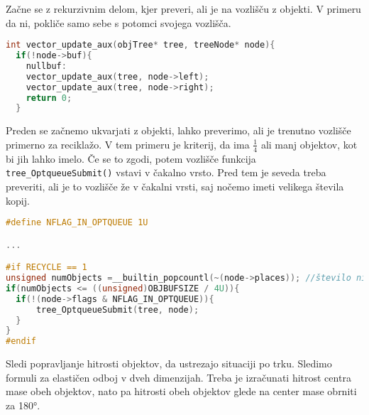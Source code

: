 \documentclass[a4paper,12pt]{article}
\begin{document}
Začne se z rekurzivnim delom, kjer preveri, ali je na vozlišču z objekti. V primeru da ni, pokliče samo sebe
s potomci svojega vozlišča.
\newpage
\begin{lstlisting}[caption={vector\_update() -- Rekurzivni del}, label=vectorupdate1, language=C]
int vector_update_aux(objTree* tree, treeNode* node){
  if(!node->buf){
    nullbuf:
    vector_update_aux(tree, node->left);
    vector_update_aux(tree, node->right);
    return 0;
  }
\end{lstlisting}
Preden se začnemo ukvarjati z objekti, lahko preverimo, ali je trenutno vozlišče primerno za reciklažo.
V tem primeru je kriterij, da ima $ \frac{1}{4}$ ali manj objektov, kot bi jih lahko imelo.
Če se to zgodi, potem vozlišče funkcija \lstinline{tree_OptqueueSubmit()} vstavi v čakalno vrsto.
Pred tem je seveda treba preveriti, ali je to vozlišče že v čakalni vrsti, saj nočemo imeti velikega števila
kopij.
\begin{lstlisting}[caption={vector\_update() -- Reciklaža}, label=vectorupdate2, language=C]
#define NFLAG_IN_OPTQUEUE 1U

...

#if RECYCLE == 1
unsigned numObjects =__builtin_popcountl(~(node->places)); //število ničel (polnih mest)
if(numObjects <= ((unsigned)OBJBUFSIZE / 4U)){
  if(!(node->flags & NFLAG_IN_OPTQUEUE)){
      tree_OptqueueSubmit(tree, node);
  }
}
#endif
\end{lstlisting}
Sledi popravljanje hitrosti objektov, da ustrezajo situaciji po trku. Sledimo formuli za elastičen odboj
v dveh dimenzijah. Treba je izračunati hitrost centra mase obeh objektov, nato pa hitrosti obeh objektov
glede na center mase obrniti za 180°.
\end{document}
